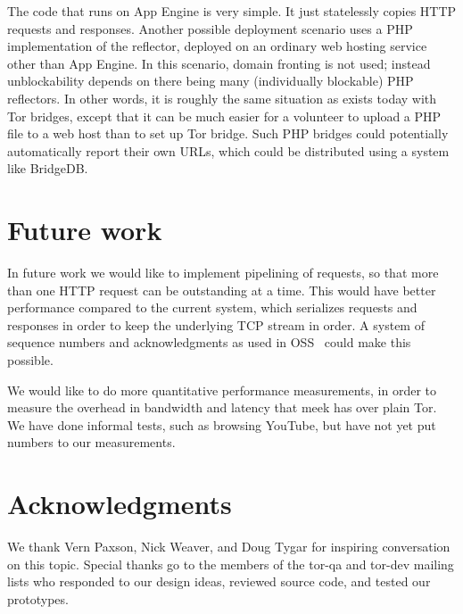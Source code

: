 \documentclass[conference]{IEEEtran}
\begin{document}

The code that runs on App Engine is very simple.
It just statelessly copies HTTP requests and responses.
Another possible deployment scenario uses a PHP implementation of the reflector,
deployed on an ordinary web hosting service other than App Engine.
In this scenario, domain fronting is not used;
instead unblockability depends on there being many (individually blockable) PHP reflectors.
In other words, it is roughly the same situation as exists today with Tor bridges,
except that it can be much easier for a volunteer to upload a PHP file to a web host
than to set up Tor bridge.
Such PHP bridges could potentially automatically report their own URLs,
which could be distributed using a system like BridgeDB.

\section{Future work}

In future work we would like to implement pipelining of requests,
so that more than one HTTP request can be outstanding at a time.
This would have better performance compared to the current system,
which serializes requests and responses in order to keep the
underlying TCP stream in order.
A system of sequence numbers and acknowledgments as used in OSS~\cite{oss}
could make this possible.

We would like to do more quantitative performance measurements,
in order to measure the overhead in bandwidth and latency that meek has over plain Tor.
We have done informal tests, such as browsing YouTube,
but have not yet put numbers to our measurements.


\section*{Acknowledgments}

We thank Vern Paxson, Nick Weaver, and Doug Tygar for inspiring conversation on this topic.
Special thanks go to the members of the tor-qa and tor-dev mailing lists
who responded to our design ideas, reviewed source code, and tested our prototypes.





\end{document}
